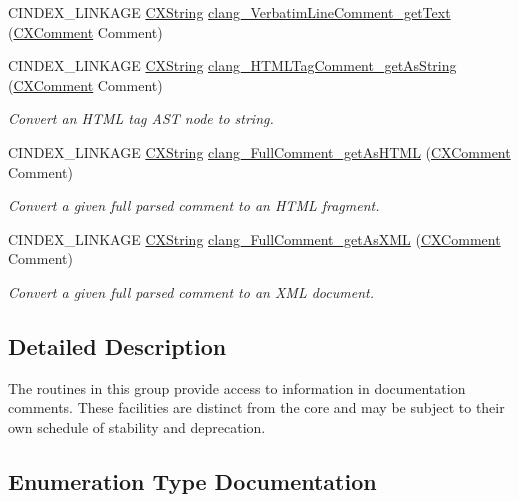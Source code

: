 \begin{DoxyCompactItemize}
\item 
C\+I\+N\+D\+E\+X\+\_\+\+L\+I\+N\+K\+A\+GE \mbox{\hyperlink{structCXString}{C\+X\+String}} \mbox{\hyperlink{group__CINDEX__COMMENT_ga4eb1de9012b525f14051409427bd8eb2}{clang\+\_\+\+Verbatim\+Line\+Comment\+\_\+get\+Text}} (\mbox{\hyperlink{structCXComment}{C\+X\+Comment}} Comment)
\item 
C\+I\+N\+D\+E\+X\+\_\+\+L\+I\+N\+K\+A\+GE \mbox{\hyperlink{structCXString}{C\+X\+String}} \mbox{\hyperlink{group__CINDEX__COMMENT_ga684a46f5993fe907016aba5dbe9d1d9e}{clang\+\_\+\+H\+T\+M\+L\+Tag\+Comment\+\_\+get\+As\+String}} (\mbox{\hyperlink{structCXComment}{C\+X\+Comment}} Comment)
\begin{DoxyCompactList}\small\item\em Convert an H\+T\+ML tag A\+ST node to string. \end{DoxyCompactList}\item 
C\+I\+N\+D\+E\+X\+\_\+\+L\+I\+N\+K\+A\+GE \mbox{\hyperlink{structCXString}{C\+X\+String}} \mbox{\hyperlink{group__CINDEX__COMMENT_gafdfc03bbfdddd06c380a2644f16ccba9}{clang\+\_\+\+Full\+Comment\+\_\+get\+As\+H\+T\+ML}} (\mbox{\hyperlink{structCXComment}{C\+X\+Comment}} Comment)
\begin{DoxyCompactList}\small\item\em Convert a given full parsed comment to an H\+T\+ML fragment. \end{DoxyCompactList}\item 
C\+I\+N\+D\+E\+X\+\_\+\+L\+I\+N\+K\+A\+GE \mbox{\hyperlink{structCXString}{C\+X\+String}} \mbox{\hyperlink{group__CINDEX__COMMENT_gac877b07be05f591fdfea05f466ed9395}{clang\+\_\+\+Full\+Comment\+\_\+get\+As\+X\+ML}} (\mbox{\hyperlink{structCXComment}{C\+X\+Comment}} Comment)
\begin{DoxyCompactList}\small\item\em Convert a given full parsed comment to an X\+ML document. \end{DoxyCompactList}\end{DoxyCompactItemize}


\subsection{Detailed Description}
The routines in this group provide access to information in documentation comments. These facilities are distinct from the core and may be subject to their own schedule of stability and deprecation. 

\subsection{Enumeration Type Documentation}
\mbox{\label{group__CINDEX__COMMENT_ga23efacd9c1e4e286a9f9714e1720fdcf}} 
